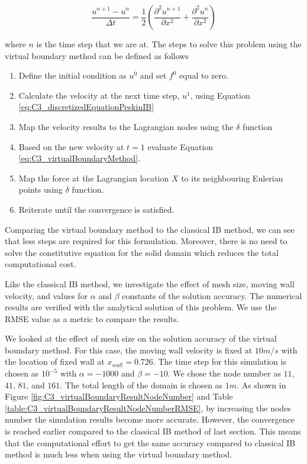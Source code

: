 \begin{equation}\label{eq:C3_virtualBoundaryDiscretization}
	\frac{u^{n+1} - u^n}{\Delta t} = 
	\frac{1}{2}
	\left(
	\frac{\partial^2 u^{n+1}}{\partial x^2} +
	\frac{\partial^2 u^{n}}{\partial x^2}
	\right)
\end{equation}

where $n$ is the time step that we are at. The steps to solve this problem using the virtual boundary method can be defined as follows

\begin{enumerate}
	\item Define the initial condition as $u^0$ and set $f^0$ equal to zero.
	\item Calculate the velocity at the next time step, $u^1$, using Equation \eqref{eq:C3_discretizedEquationPeskinIB}
	\item Map the velocity results to the Lagrangian nodes using the $\delta$ function
	\item Based on the new velocity at $t=1$ evaluate Equation \eqref{eq:C3_virtualBoundaryMethod}.
	\item Map the force at the Lagrangian location $X$ to its neighbouring Eulerian points using $\delta$ function.
	\item Reiterate until the convergence is satisfied.
\end{enumerate}

Comparing the virtual boundary method to the classical IB method, we can see that less steps are required for this formulation. Moreover, there is no need to solve the constitutive equation for the solid domain which reduces the total computational cost.

Like the classical IB method, we investigate the effect of mesh size, moving wall velocity, and values for $\alpha$ and $\beta$ constants of the solution accuracy. The numerical results are verified with the analytical solution of this problem. We use the RMSE value as a metric to compare the results.

We looked at the effect of mesh size on the solution accuracy of the virtual boundary method. For this case, the moving wall velocity is fixed at $10 m/s$ with the location of fixed wall at $x_{wall} = 0.726$. The time step for this simulation is chosen as $10^{-5}$ with $\alpha = -1000$ and $\beta = -10$. We chose the node number as $11$, $41$, $81$, and $161$. The total length of the domain is chosen as $1 m$. As shown in Figure \ref{fig:C3_virtualBoundaryResultNodeNumber} and Table \ref{table:C3_virtualBoundaryResultNodeNumberRMSE}, by increasing the nodes number the simulation results become more accurate. However, the convergence is reached earlier compared to the classical IB method of last section. This means that the computational effort to get the same accuracy compared to classical IB method is much less when using the virtual boundary method. 

